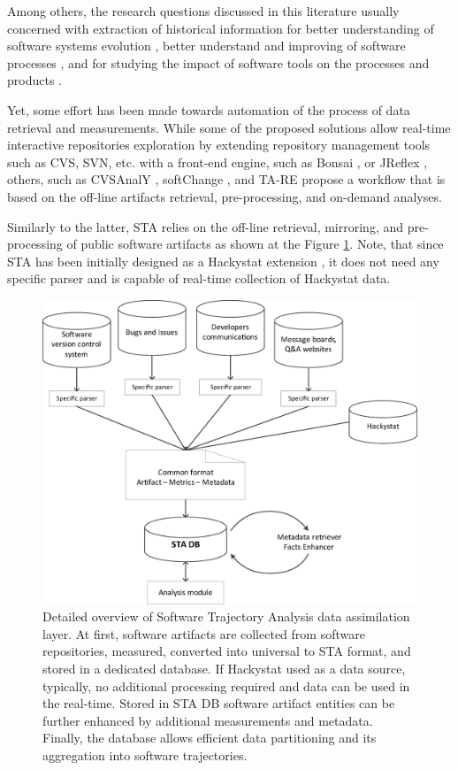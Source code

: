 Among others, the research questions discussed in this literature usually concerned with extraction of historical information 
for better understanding of software systems evolution \cite{citeulike:277045} \cite{citeulike:4000311}, 
better understand and improving of software processes \cite{citeulike:5803126}, 
and for studying the impact of software tools on the processes and products \cite{citeulike:13125389}. 

Yet, some effort has been made towards automation of the process of data retrieval and measurements. 
While some of the proposed solutions allow real-time interactive repositories exploration by extending 
repository management tools such as CVS, SVN, etc. with a front-end engine, such as Bonsai \cite{bonsai},
or JReflex \cite{citeulike:3017440}, others, such as CVSAnalY \cite{citeulike:6544724}, softChange \cite{citeulike:13125395},
and {TA}-{RE} \cite{citeulike:4000311} propose a workflow that is based on the off-line artifacts retrieval, 
pre-processing, and on-demand analyses.

Similarly to the latter, STA relies on the off-line retrieval, mirroring, and pre-processing of public software artifacts as
shown at the Figure \ref{fig:sta-assimilation}. Note, that since STA has been initially designed as a Hackystat extension 
\cite{csdl2-10-09}, it does not need any specific parser and is capable of real-time collection of Hackystat data.

\begin{figure}[t]
   \centering
   \includegraphics[width=115mm]{figures/Flow.eps}
   \caption{Detailed overview of Software Trajectory Analysis data assimilation layer. 
    At first, software artifacts are collected from software repositories, measured, converted into 
    universal to STA format, and stored in a dedicated database.
    If Hackystat used as a data source, typically, no additional processing required and data can be used in the real-time.
    Stored in STA DB software artifact entities can be further enhanced by additional measurements and metadata.
    Finally, the database allows efficient data partitioning and its aggregation into software trajectories.}
   \label{fig:sta-assimilation}
\end{figure}

